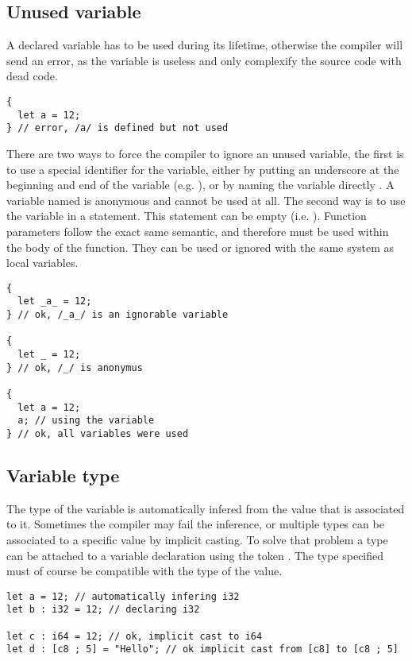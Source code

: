 \subsection{Unused variable}

A declared variable has to be used during its lifetime, otherwise the compiler
will send an error, as the variable is useless and only complexify the source
code with dead code.

\begin{lstlisting}[style=coloredverbatim]
{
  let a = 12;
} // error, /a/ is defined but not used
\end{lstlisting}

There are two ways to force the compiler to ignore an unused variable, the first
is to use a special identifier for the variable, either by putting an underscore
at the beginning and end of the variable (e.g. ), or by naming the
variable directly \token{\_}. A variable named \token{\_} is anonymous and
cannot be used at all. The second way is to use the variable in a statement.
This statement can be empty (i.e. ). Function parameters follow the
exact same semantic, and therefore must be used within the body of the function.
They can be used or ignored with the same system as local variables.

\begin{lstlisting}[style=coloredverbatim]
{
  let _a_ = 12;
} // ok, /_a_/ is an ignorable variable

{
  let _ = 12;
} // ok, /_/ is anonymus

{
  let a = 12;
  a; // using the variable
} // ok, all variables were used
\end{lstlisting}

\subsection{Variable type}

The type of the variable is automatically infered from the value that is
associated to it. Sometimes the compiler may fail the inference, or multiple
types can be associated to a specific value by implicit casting. To solve that
problem a type can be attached to a variable declaration using the token
\token{:}. The type specified must of course be compatible with the type of the
value.

\begin{lstlisting}[style=coloredverbatim]
let a = 12; // automatically infering i32
let b : i32 = 12; // declaring i32

let c : i64 = 12; // ok, implicit cast to i64
let d : [c8 ; 5] = "Hello"; // ok implicit cast from [c8] to [c8 ; 5]
\end{lstlisting}

